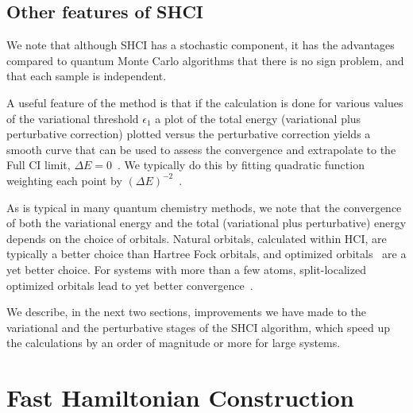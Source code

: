 \documentclass[%
reprint,
 superscriptaddress,
 amsmath,amssymb,
 aps,
]{revtex4-1}
\begin{document}
\subsection{Other features of SHCI}
\label{other_features}
We note that although SHCI has a stochastic component, it has the advantages compared to quantum Monte Carlo algorithms that there is no sign problem,
and that each sample is independent.

A useful feature of the method is that if the calculation is done for various values of the variational threshold $\epsilon_1$
a plot of the total energy (variational plus perturbative correction) plotted versus the perturbative correction yields a smooth curve that can be used to assess the convergence and extrapolate to the Full CI limit,  $\Delta E=0$~\cite{HolUmrSha-JCP-17}.
We typically do this by fitting quadratic function weighting each point by $\left(\Delta E\right)^{-2}$~\cite{ChiHolOttUmrShaZim-JPCA-18}.

As is typical in many quantum chemistry methods, we note that the convergence of both the variational energy and the total (variational plus perturbative) energy
depends on the choice of orbitals.  Natural orbitals, calculated within HCI, are typically a better choice than Hartree Fock orbitals,
and optimized orbitals~\cite{SmiMusHolSha-JCTC-17} are a yet better choice.  For systems with more than a few atoms,
split-localized optimized orbitals lead to yet better convergence~\cite{ChiHolOttUmrShaZim-JPCA-18}.

We describe, in the next two sections, improvements we have made to the variational and the perturbative stages of the SHCI algorithm,
which speed up the calculations by an order of magnitude or more for large systems.

\section{Fast Hamiltonian Construction}
\label{fast}
\end{document}
